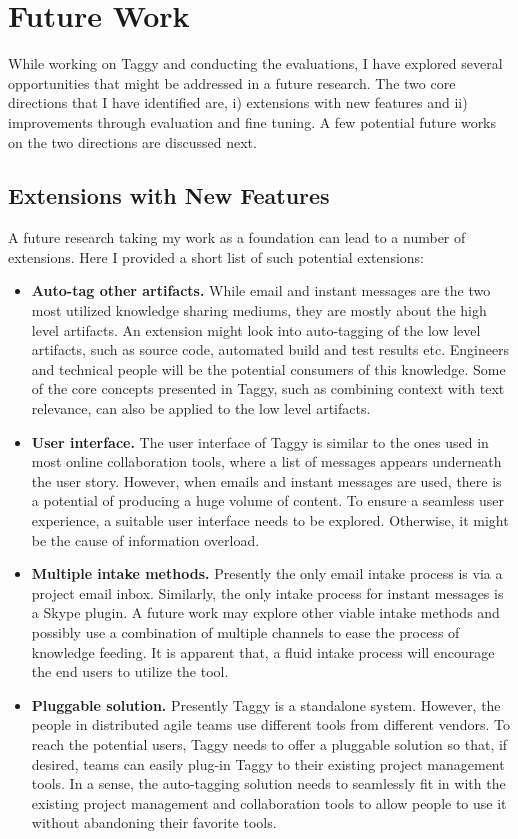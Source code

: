 \section{Future Work}
While working on Taggy and conducting the evaluations, I have explored several opportunities that might be addressed in a future research. The two core directions that I have identified are, i) extensions with new features and ii) improvements through evaluation and fine tuning. A few potential future works on the two directions are discussed next.

\subsection{Extensions with New Features}
A future research taking my work as a foundation can lead to a number of extensions. Here I provided a short list of such potential extensions:

\begin{itemize}
	\item \textbf{Auto-tag other artifacts.} While email and instant messages are the two most utilized knowledge sharing mediums, they are mostly about the high level artifacts. An extension might look into auto-tagging of the low level artifacts, such as source code, automated build and test results etc. Engineers and technical people will be the potential consumers of this knowledge. Some of the core concepts presented in Taggy, such as combining context with text relevance, can also be applied to the low level artifacts.
	
	\item \textbf{User interface.} The user interface of Taggy is similar to the ones used in most online collaboration tools, where a list of messages appears underneath the user story. However, when emails and instant messages are used, there is a potential of producing a huge volume of content. To ensure a seamless user experience, a suitable user interface needs to be explored. Otherwise, it might be the cause of information overload.
	
	\item \textbf{Multiple intake methods.} Presently the only email intake process is via a project email inbox. Similarly, the only intake process for instant messages is a Skype plugin. A future work may explore other viable intake methods and possibly use a combination of multiple channels to ease the process of knowledge feeding. It is apparent that, a fluid intake process will encourage the end users to utilize the tool.
	
	\item \textbf{Pluggable solution.} Presently Taggy is a standalone system. However, the people in distributed agile teams use different tools from different vendors. To reach the potential users, Taggy needs to offer a pluggable solution so that, if desired, teams can easily plug-in Taggy to their existing project management tools. In a sense, the auto-tagging solution needs to seamlessly fit in with the existing project management and collaboration tools to allow people to use it without abandoning their favorite tools.
\end{itemize}		
	
